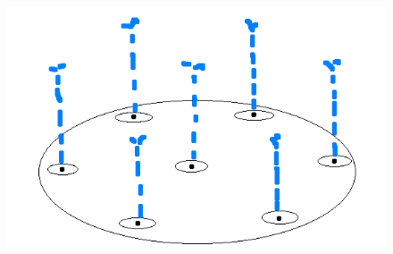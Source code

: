\begin{figure}
\centering
\includegraphics[width=5.5in]{Splash_Pad_Paint.png}
\end{figure}

\maketitle

\newpage










